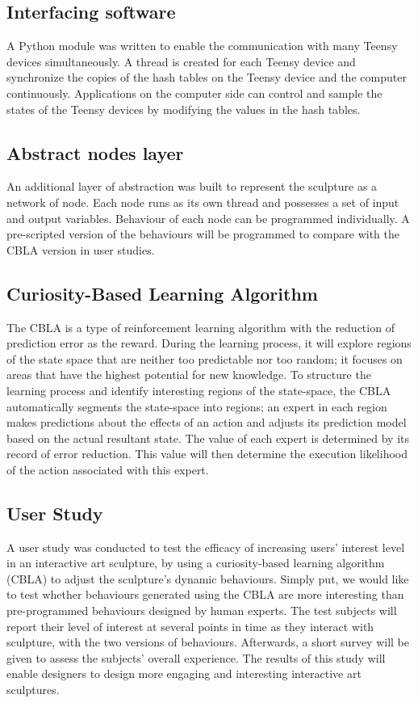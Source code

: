 \subsection{Interfacing software}

A Python module was written to enable the communication with many Teensy devices simultaneously. A thread is created for each Teensy device and synchronize the copies of the hash tables on the Teensy device and the computer continuously. Applications on the computer side can control and sample the states of the Teensy devices by modifying the values in the hash tables.

\subsection{Abstract nodes layer}

An additional layer of abstraction was built to represent the sculpture as a network of node. Each node runs as its own thread and possesses a set of input and output variables. Behaviour of each node can be programmed individually. A pre-scripted version of the behaviours will be programmed to compare with the CBLA version in user studies.

\subsection{Curiosity-Based Learning Algorithm}

The CBLA is a type of reinforcement learning algorithm with the reduction of prediction error as the reward. During the learning process, it will explore regions of the state space that are neither too predictable nor too random; it focuses on areas that have the highest potential for new knowledge. To structure the learning process and identify interesting regions of the state-space, the CBLA automatically segments the state-space into regions; an expert in each region makes predictions about the effects of an action and adjusts its prediction model based on the actual resultant state. The value of each expert is determined by its record of error reduction. This value will then determine the execution likelihood of the action associated with this expert.

\subsection{User Study}

A user study was conducted to test the efficacy of increasing users’ interest level in an interactive art sculpture, by using a curiosity-based learning algorithm (CBLA) to adjust the sculpture’s dynamic behaviours. Simply put, we would like to test whether behaviours generated using the CBLA are more interesting than pre-programmed behaviours designed by human experts. The test subjects will report their level of interest at several points in time as they interact with sculpture, with the two versions of behaviours. Afterwards, a short survey will be given to assess the subjects’ overall experience. The results of this study will enable designers to design more engaging and interesting interactive art sculptures.



